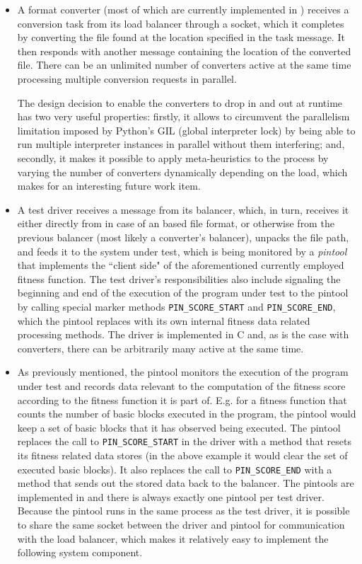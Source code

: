 \begin{itemize}
  \item A format converter (most of which are currently implemented in \python) receives a conversion task from
  its load balancer through a \zmq socket, which it completes by converting the file found at the location
  specified in the task message. It then responds with another message containing the location of the converted
  file. There can be an unlimited number of converters active at the same time processing multiple
  conversion requests in parallel. 
  
  The design decision to enable the converters to drop in and out at
  runtime has two very useful properties: firstly, it allows to circumvent the parallelism limitation
  imposed by {\small Python's} GIL (global interpreter lock) by being able to run multiple interpreter
  instances in parallel without them interfering; and, secondly, it makes it possible to apply meta-heuristics
  to the process by varying the number of converters dynamically depending on the load, which makes for an
  interesting future work item. 
  
  \item A test driver receives a message from its balancer, which, in turn, receives it either directly from
  \xmlmate in case of an \xml based file format, or otherwise from the previous balancer (most likely a 
  converter's balancer), unpacks the file path, and feeds it to the system under test, which is being monitored
  by a \emph{pintool} that implements the ``client side" of the aforementioned currently employed fitness
  function. The test driver's responsibilities also include signaling the beginning and end of the execution of
  the program under test to the pintool by calling special marker methods \texttt{PIN\_SCORE\_START}
  and \texttt{PIN\_SCORE\_END}, which the pintool replaces with its own internal fitness data related
  processing methods. The driver is implemented in {\small C} and, as is the case with converters, there can
  be arbitrarily many active at the same time.
  
  \item As previously mentioned, the pintool monitors the execution of the program under test and records
  data relevant to the computation of the fitness score according to the fitness function it is part of.
  E.g. for a fitness function that counts the number of basic blocks executed in the program, the pintool 
  would keep a set of basic blocks that it has observed being executed. The pintool replaces the call to 
  \texttt{PIN\_SCORE\_START} in the driver with a method that resets its fitness related data stores (in the 
  above example it would clear the set of executed basic blocks). It also replaces the call to
  \texttt{PIN\_SCORE\_END} with a method that sends out the stored data back to the balancer. 
  The pintools are implemented in \cpp and there is always exactly one pintool per test driver.
  Because the pintool runs in the same process as the test driver, it is possible to share the same \zmq
  socket between the driver and pintool for communication with the load balancer, which makes it relatively
  easy to implement the following system component.
  

\end{itemize}
